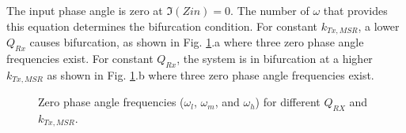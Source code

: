 \documentclass[journal]{IEEEtran}
\begin{document}
The input phase angle is zero at $\Im (Zin) =0$. The number of $\omega$ that provides this equation determines the bifurcation condition. For constant $k_{Tx,MSR}$, a lower $Q_{Rx}$  causes bifurcation, as shown in Fig. \ref{fig:critic_coupling}.a
where three zero phase angle frequencies exist.
For constant  $Q_{Rx}$, the system is in bifurcation at a higher  $k_{Tx,MSR}$ as shown in Fig. \ref{fig:critic_coupling}.b where three zero phase angle frequencies exist.
\begin{figure}[h]
    \centering
    \caption{Zero phase angle frequencies ($\omega_l$, $\omega_m$, and $\omega_h$) for different $Q_{RX}$ and $k_{Tx,MSR}$.}
    \label{fig:critic_coupling}
\end{figure}


\end{document}
